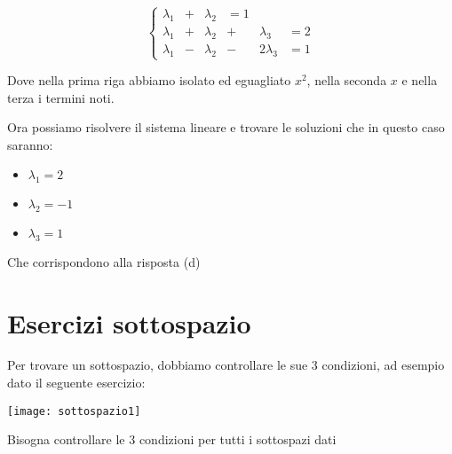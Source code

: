 \documentclass[a4paper]{article}
\begin{document}
\begin{equation*}
	\left\{
	\begin{alignedat}{3}
		\lambda_1 & +{} & \lambda_2 & = 1 \\
		\lambda_1 & +{} & \lambda_2 & +{} & \lambda_3 & = 2 \\
		\lambda_1 & -{} & \lambda_2 & -{} & 2\lambda_3 & = 1
	\end{alignedat}
	\right.
\end{equation*}

Dove nella prima riga abbiamo isolato ed eguagliato $x^2$, nella seconda $x$ e nella terza i termini noti.

Ora possiamo risolvere il sistema lineare e trovare le soluzioni che in questo caso saranno:

\begin{itemize}
	\item $\lambda_1 = 2$
	\item $\lambda_2 = -1$
	\item $\lambda_3 = 1$
\end{itemize}

Che corrispondono alla risposta (d)
\section{Esercizi sottospazio}

Per trovare un sottospazio, dobbiamo controllare le sue 3 condizioni, ad esempio dato il seguente esercizio:

\texttt{[image: sottospazio1]}

Bisogna controllare le 3 condizioni per tutti i sottospazi dati
\end{document}
